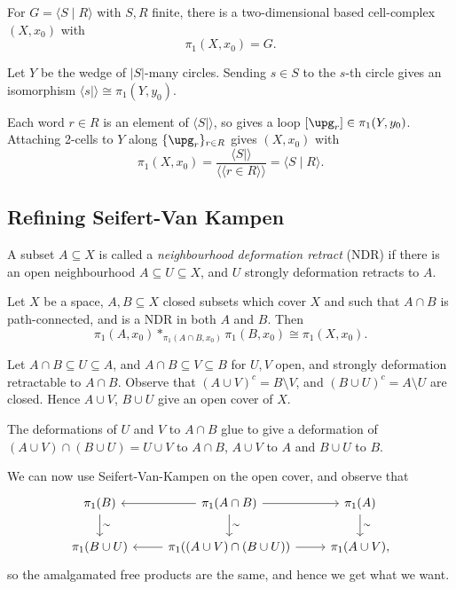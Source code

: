\documentclass[12pt]{article}
\begin{document}
\begin{corollary}
	For $G = \langle S \mid R \rangle$ with $S, R$ finite, there is a two-dimensional based cell-complex $(X, x_0)$ with
	\[
	\pi_1(X, x_0) = G.
	\]
\end{corollary}

\begin{proofbox}
	Let $Y$ be the wedge of $|S|$-many circles. Sending $s \in S$ to the $s$-th circle gives an isomorphism $\langle s \mid \rangle \cong \pi_1(Y, y_0)$.

	Each word $r \in R$ is an element of $\langle S \mid \rangle$, so gives a loop $[ \upg_r ] \in \pi_1(Y, y_0)$. Attaching 2-cells to $Y$ along $\{\upg_r\}_{r \in R}$ gives $(X, x_0)$ with
	\[
	\pi_1(X, x_0) = \frac{\langle S \mid \rangle}{\langle\langle r \in R \rangle \rangle} = \langle S \mid R \rangle.
	\]
\end{proofbox}

\subsection{Refining Seifert-Van Kampen}
\label{ref_svk}

\begin{definition}
	A subset $A \subseteq X$ is called a \emph{neighbourhood deformation retract} (NDR) if there is an open neighbourhood $A \subseteq U \subseteq X$, and $U$ strongly deformation retracts to $A$.
\end{definition}

\begin{theorem}
	Let $X$ be a space, $A, B \subseteq X$ closed subsets which cover $X$ and such that $A \cap B$ is path-connected, and is a NDR in both $A$ and $B$. Then
	\[
	\pi_1(A, x_0) \ast_{\pi_1(A \cap B, x_0)} \pi_1(B, x_0) \cong \pi_1(X, x_0).
	\]
\end{theorem}

\begin{proofbox}
	Let $A \cap B \subseteq U \subseteq A$, and $A \cap B \subseteq V \subseteq B$ for $U, V$ open, and strongly deformation retractable to $A \cap B$. Observe that $(A \cup V)^{c} = B \setminus V$, and $(B \cup U)^{c} = A \setminus U$ are closed. Hence $A \cup V$, $B \cup U$ give an open cover of $X$.

	The deformations of $U$ and $V$ to $A \cap B$ glue to give a deformation of $(A \cup V) \cap (B \cup U) = U \cup V$ to $A \cap B$, $A \cup V$ to $A$ and $B \cup U$ to $B$.

	We can now use Seifert-Van-Kampen on the open cover, and observe that
	\[
	\begin{tikzcd}
		\pi_1(B) \arrow[d, "\sim"] & \pi_1(A \cap B) \arrow[l] \arrow[r] \arrow[d, "\sim"] & \pi_1(A) \arrow[d, "\sim"] \\
		\pi_1(B \cup U) & \pi_1((A \cup V) \cap (B \cup U)) \arrow[l] \arrow[r] & \pi_1(A \cup V),
	\end{tikzcd}
	\]
	so the amalgamated free products are the same, and hence we get what we want.
\end{proofbox}
\end{document}

